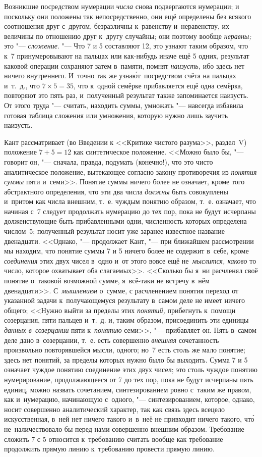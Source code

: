 Возникшие посредством нумерации {\em числа} снова подвергаются нумерации; и
поскольку они положены так непосредственно, они ещё определены без всякого
соотношения друг с~другом, безразличны к~равенству и~неравенству, их величины
по отношению друг к~другу случайны; они поэтому вообще {\em неравны;} это "---
{\em сложение}. "--- Что 7 и 5 составляют 12, это узнают таким образом, что к~7
принумеровывают на пальцах или как-нибудь иначе ещё 5 одних, результат каковой
операции сохраняют затем в~памяти, помнят {\em наизусть,} ибо здесь нет ничего
внутреннего. И~точно так же узна\'{ю}т~посредством счёта на пальцах и~т.~д.,
что $7\times 5=35$, что к~одной семёрке прибавляется ещё одна семёрка,
повторяют это пять раз, и~полученный результат также запоминается наизусть. От
этого труда "--- считать, находить суммы, умножать "--- навсегда избавила
готовая таблица сложения или умножения, которую нужно лишь заучить наизусть.

Кант рассматривает (во Введении к <<Критике чистого разума>>, раздел~V)
положение $7+5=12$ как синтетическое положение. <<Можно было бы, "---
говорит он, "--- сначала, правда, подумать (конечно!), что это чисто
аналитическое положение, вытекающее согласно закону противоречия из
{\em понятия суммы} пяти и~семи>>. Понятие суммы ничего более не означает,
кроме того абстрактного определения, что эти два числа {\em должны} быть
совокуплены и~притом как числа внешним, т.~е. чуждым понятию образом, т.~е.
означает, что начиная с~7 следует продолжать нумерацию до тех пор, пока не
будут исчерпаны долженствующие быть прибавленными одни, численность которых
определена числом~5; полученный результат носит уже заранее известное название
двенадцати. <<Однако, "--- продолжает Кант, "--- при ближайшем рассмотрении мы
находим, что понятие суммы 7 и 5 ничего более не содержит в~себе, кроме
{\em соединения} этих двух чисел в~одно и~от этого вовсе ещё
не~{\em мыслится, каково} то число, которое охватывает оба слагаемых>>.
<<Сколько бы я~ни расчленял своё понятие о~таковой возможной сумме,
я~всё-таки не встречу в~нём двенадцати>>. С~{\em мышлением} о~сумме,
с расчленением понятия переход от указанной задачи к~получающемуся результату
в~самом деле не имеет ничего общего; <<Нужно выйти за пределы этих
{\em понятий,} прибегнуть к~помощи
созерцания, пяти пальцев и~т.~д. и, таким образом, присоединить эти
единицы {\em данных в~созерцании} пяти к~{\em понятию} семи>>, "--- прибавляет
он. Пять в~самом деле дано в~созерцании, т.~е. есть совершенно {\em внешняя}
сочетанность произвольно повторявшейся мысли, одного; но~7 есть столь же мало
понятие; здесь нет понятий, за пределы которых нужно было бы выходить. Сумма
7 и 5 означает чуждое понятию соединение этих двух чисел; это столь чуждое
понятию нумерирование, продолжающееся от 7 до тех пор, пока не будут исчерпаны
пять единиц, можно назвать сочетанием, синтезированием ровно с~таким же правом,
как и~нумерацию, начинающую с~одного, "--- синтезированием, которое, однако,
носит совершенно аналитический характер, так как связь здесь всецело
искусственная, в~ней нет ничего такого и~в~неё не привходит ничего такого,
чт\'{о} не~наличествовало бы перед нами совершенно внешним образом. Требование
сложить 7 с 5 относится к~требованию считать вообще как требование продолжить
прямую линию к~требованию провести прямую линию.

